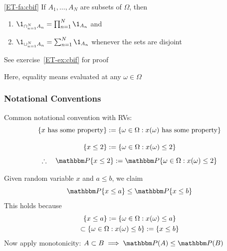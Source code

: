 \begin{frame}

    \vspace{2em}
    \Fact\eqref{ET-fa:cbif}
    If $A_1, \ldots, A_N$ are subsets of $\Omega$, then
    \begin{enumerate}
        \item $\1_{\cap_{n=1}^N A_n} = \prod_{n=1}^N \1_{A_n}$ and
        \item $\1_{\cup_{n=1}^N A_n } = \sum_{n=1}^N \1_{A_n}$
            whenever the sets are disjoint
    \end{enumerate}
    See
    exercise~\ref{ET-ex:cbif} for proof 
    
    Here, equality means evaluated at any $\omega \in \Omega$
    
\end{frame}

\begin{frame}\frametitle{Notational Conventions}

    \vspace{2em}
    Common notational convention with RVs:
    \begin{equation*}
        \{ x \text{ has some property} \} :=
        \{ \omega \in \Omega : x(\omega) \text{ has some property} \}
    \end{equation*}

    \Eg 
    \begin{equation*}
        \{x \leq 2\} := \{ \omega \in \Omega : x(\omega) \leq 2 \}
    \end{equation*}
    \vspace{1em}
    \begin{equation*}
        \fore
        \PP\{x \leq 2\} := \PP\setntn{\omega \in \Omega}{x(\omega) \leq 2}
    \end{equation*}
\end{frame}

\begin{frame}

    \vspace{2em}
    \Eg Given random variable $x$ and $a \leq b$, we claim
    \begin{equation*}
        \label{eq:exno}
        \PP\{x \leq a\} \leq \PP\{x \leq b\}
    \end{equation*}
    This holds because
    \begin{multline*}
            \{x \leq a\} 
            := \{ \omega \in \Omega : x(\omega) \leq a \} \\
            \subset \{ \omega \in \Omega : x(\omega) \leq b \} 
            := \{x \leq b\}
    \end{multline*}
    Now apply monotonicity: $A \subset B \implies \PP(A) \leq \PP(B)$
    
\end{frame}

